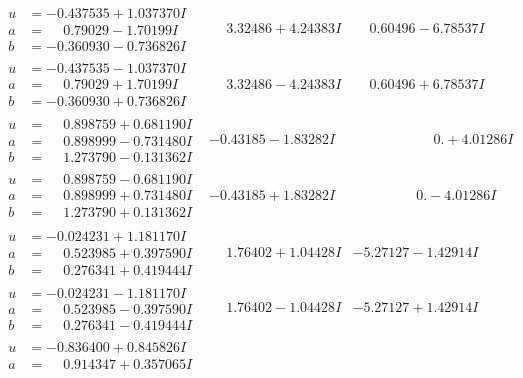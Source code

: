 \documentclass[1p]{elsarticle_modified}
\theoremstyle{definition}
\begin{document}
$$\begin{array}{c|c|c}
\begin{aligned}
u &= -0.437535 + 1.037370 I \\
a &= \phantom{-}0.79029 - 1.70199 I \\
b &= -0.360930 - 0.736826 I\end{aligned}
 & \phantom{-}3.32486 + 4.24383 I & \phantom{-}0.60496 - 6.78537 I \\ \hline\begin{aligned}
u &= -0.437535 - 1.037370 I \\
a &= \phantom{-}0.79029 + 1.70199 I \\
b &= -0.360930 + 0.736826 I\end{aligned}
 & \phantom{-}3.32486 - 4.24383 I & \phantom{-}0.60496 + 6.78537 I \\ \hline\begin{aligned}
u &= \phantom{-}0.898759 + 0.681190 I \\
a &= \phantom{-}0.898999 - 0.731480 I \\
b &= \phantom{-}1.273790 - 0.131362 I\end{aligned}
 & -0.43185 - 1.83282 I & \phantom{-0.000000 -}0. + 4.01286 I \\ \hline\begin{aligned}
u &= \phantom{-}0.898759 - 0.681190 I \\
a &= \phantom{-}0.898999 + 0.731480 I \\
b &= \phantom{-}1.273790 + 0.131362 I\end{aligned}
 & -0.43185 + 1.83282 I & \phantom{-0.000000 } 0. - 4.01286 I \\ \hline\begin{aligned}
u &= -0.024231 + 1.181170 I \\
a &= \phantom{-}0.523985 + 0.397590 I \\
b &= \phantom{-}0.276341 + 0.419444 I\end{aligned}
 & \phantom{-}1.76402 + 1.04428 I & -5.27127 - 1.42914 I \\ \hline\begin{aligned}
u &= -0.024231 - 1.181170 I \\
a &= \phantom{-}0.523985 - 0.397590 I \\
b &= \phantom{-}0.276341 - 0.419444 I\end{aligned}
 & \phantom{-}1.76402 - 1.04428 I & -5.27127 + 1.42914 I \\ \hline\begin{aligned}
u &= -0.836400 + 0.845826 I \\
a &= \phantom{-}0.914347 + 0.357065 I \\

\end{aligned}
\end{array}$$
\end{document}
